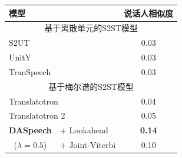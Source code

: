 \begin{table}[!htbp]
    \label{tab:daspeech_speaker}
    \centering
    \small
    \begin{tabular}{llc}
        \toprule
        \textbf{模型}  &   & \textbf{说话人相似度} \\
        \midrule
        \multicolumn{3}{c}{{基于离散单元的S2ST模型}} \\
        \midrule
        \multicolumn{2}{l}{S2UT \citep{s2ut}} & 0.03 \\
        \multicolumn{2}{l}{UnitY \citep{inaguma-etal-2023-unity}} & 0.03 \\
        \multicolumn{2}{l}{TranSpeech \citep{huang2023transpeech}} & 0.03 \\
        \midrule
        \multicolumn{3}{c}{{基于梅尔谱的S2ST模型}} \\
        \midrule
        \multicolumn{2}{l}{Translatotron \citep{translatotron}} & 0.04 \\
        \multicolumn{2}{l}{Translatotron 2 \citep{translatotron2}} & 0.05 \\
        \midrule
        \multicolumn{1}{c}{\textbf{DASpeech}} & + Lookahead & \textbf{0.14} \\
        \multicolumn{1}{c}{($\lambda=0.5$)}   & + Joint-Viterbi & 0.10 \\
        \bottomrule
    \end{tabular}
\end{table}
